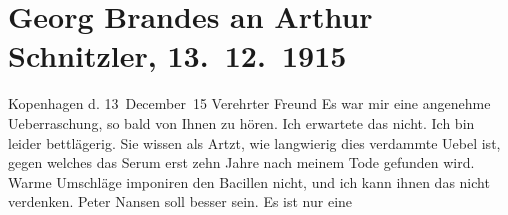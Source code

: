 

         
         \newcommand{\erwaehntePersonen}{Personen:  ?? [Dänischer Journalist],  ?? [Korrespondent aus Russland], Sophie Hatzfeld, Georg Herwegh, Emma Herwegh, Marcel Herwegh, Ferdinand Lassalle, Peter Nansen, Reinhold Philipp}
         \newcommand{\erwaehnteInstitutionen}{}
         \newcommand{\erwaehnteOrte}{Orte: Deutschland, Dänemark, Kopenhagen, Russland, Wien, Österreich}
         \newcommand{\erwaehnteWerke}{Werke: ?? [Russischer Korrespondentenbericht], Ferdinand Lassalle’s Briefe an Georg Herwegh, Professor Bernhardi. Komödie in fünf Akten}
               \section[Georg Brandes an Arthur Schnitzler, 13. 12. 1915]{ Georg Brandes an Arthur Schnitzler, 13. 12. 1915}\nopagebreak{}\rehead{ }\begin{ledgroupsized}[t]{13cm}\normalsize\beginnumbering \toendnotes[C]{\smallbreak\pagebreak[2]} 
\toendnotes[C]{\smallbreak}\pstart
           \raggedleft{}{\pb}Kopenhagen d. 13 December 15\pend
           \pstart
           Verehrter Freund \hspace*{1.5em}Es war mir eine angenehme Ueberraschung, so bald
               von Ihnen zu hören. Ich erwartete das nicht. Ich bin leider bettlägerig. Sie wissen
               als Artzt, wie langwierig dies verdammte Uebel ist, gegen welches das Serum erst zehn
               Jahre nach meinem Tode gefunden wird. Warme Umschläge imponiren den Bacillen nicht,
               und ich kann ihnen das nicht verdenken.\pend
           \pstart
           Peter Nansen soll besser sein. Es ist nur eine

\end{ledgroupsized}

